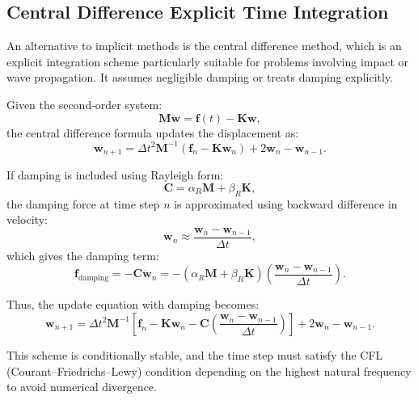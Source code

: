 \documentclass{article}
\begin{document}
	
	\subsection{Central Difference Explicit Time Integration}
	
	An alternative to implicit methods is the central difference method, which is an explicit integration scheme particularly suitable for problems involving impact or wave propagation. It assumes negligible damping or treats damping explicitly.
	
	Given the second-order system:
	\begin{equation}
		\mathbf{M} \ddot{\mathbf{w}} = \mathbf{f}(t) - \mathbf{K} \mathbf{w},
	\end{equation}
	the central difference formula updates the displacement as:
	\begin{equation}
		\mathbf{w}_{n+1} = \Delta t^2 \mathbf{M}^{-1} \left( \mathbf{f}_n - \mathbf{K} \mathbf{w}_n \right) + 2\mathbf{w}_n - \mathbf{w}_{n-1}.
	\end{equation}
	
	If damping is included using Rayleigh form:
	\begin{equation}
		\mathbf{C} = \alpha_R \mathbf{M} + \beta_R \mathbf{K},
	\end{equation}
	the damping force at time step \( n \) is approximated using backward difference in velocity:
	\begin{equation}
		\dot{\mathbf{w}}_n \approx \frac{\mathbf{w}_n - \mathbf{w}_{n-1}}{\Delta t},
	\end{equation}
	which gives the damping term:
	\begin{equation}
		\mathbf{f}_{\text{damping}} = -\mathbf{C} \dot{\mathbf{w}}_n = - \left( \alpha_R \mathbf{M} + \beta_R \mathbf{K} \right) \left( \frac{\mathbf{w}_n - \mathbf{w}_{n-1}}{\Delta t} \right).
	\end{equation}
	
	Thus, the update equation with damping becomes:
	\begin{equation}
		\mathbf{w}_{n+1} = \Delta t^2 \mathbf{M}^{-1} \left[ \mathbf{f}_n - \mathbf{K} \mathbf{w}_n - \mathbf{C} \left( \frac{\mathbf{w}_n - \mathbf{w}_{n-1}}{\Delta t} \right) \right] + 2\mathbf{w}_n - \mathbf{w}_{n-1}.
	\end{equation}
	
	This scheme is conditionally stable, and the time step must satisfy the CFL (Courant–Friedrichs–Lewy) condition depending on the highest natural frequency to avoid numerical divergence.
	
\end{document}
